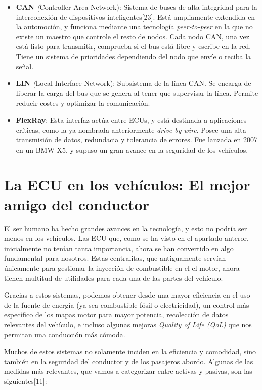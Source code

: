 \begin{itemize}
    \item \textbf{CAN} \textit({Controller Area Network}): Sistema de buses de alta integridad para la interconexión de dispositivos inteligentes[23].  Está ampliamente extendida en la automoción, y funciona mediante una tecnología \textit{peer-to-peer} en la que no existe un maestro que controle el resto de nodos. Cada nodo CAN, una vez está listo para transmitir, comprueba si el bus está libre y escribe en la red. Tiene un sistema de prioridades dependiendo del nodo que envíe o reciba la señal. 
    \item \textbf{LIN} \textit({Local Interface Network}): Subsistema de la línea CAN. Se encarga de liberar la carga del bus que se genera al tener que supervisar la línea. Permite reducir costes y optimizar la comunicación.
    \item \textbf{FlexRay}: Esta interfaz actúa entre ECUs, y está destinada a aplicaciones críticas, como la ya nombrada anteriormente \textit{drive-by-wire}. Posee una alta transmisión de datos, redundacia y tolerancia de errores. Fue lanzada en 2007 en un BMW X5, y supuso un gran avance en la seguridad de los vehículos.
\end{itemize}

\section{La ECU en los vehículos: El mejor amigo del conductor}

El ser humano ha hecho grandes avances en la tecnología, y esto no podría ser menos en los vehículos. Las ECU que, como se ha visto en el apartado anteror, inicialmente no tenían tanta importancia, ahora se han convertido en algo fundamental para nosotros. Estas centralitas, que antiguamente servían únicamente para gestionar la inyección de combustible en el el motor, ahora tienen multitud de utilidades para cada una de las partes del vehículo.

Gracias a estos sistemas, podemos obtener desde una mayor eficiencia en el uso de la fuente de energía (ya sea combustible fósil o electricidad), un control más específico de los mapas motor para mayor potencia, recolección de datos relevantes del vehículo, e incluso algunas mejoras \textit{Quality of Life (QoL)} que nos permitan una conducción más cómoda. 

Muchos de estos sistemas no solamente inciden en la eficiencia y comodidad, sino también en la seguridad del conductor y de los pasajeros abordo. Algunas de las medidas más relevantes, que vamos a categorizar entre activas y pasivas, son las siguientes[11]:

